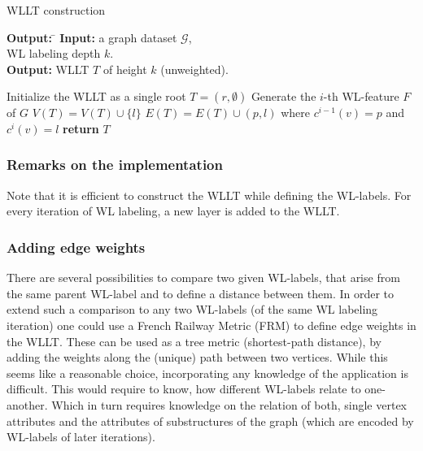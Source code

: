 \begin{algorithm}[H]
	\caption{WLLT construction} \label{alg:WLLTconstruction} 
	\begin{tabbing}
		\textbf{Output:} \= \kill
		\textbf{Input:} \>a graph dataset $\mathcal{G}$,\\
		\>WL labeling depth $k$.\\
		\textbf{Output:} \>WLLT $T$ of height $k$ (unweighted).
	\end{tabbing}	
	\begin{algorithmic}[1]		
		\State Initialize the WLLT as a single root $T=({r}, \emptyset)$
				\State Generate the $i$-th WL-feature $F$ of $G$
						\State $V(T) = V(T) \cup \{ l \}$
						\State $E(T) = E(T) \cup (p, l)$ where $c^{i-1}(v)=p$ and $c^{i}(v)=l$ 
					\EndIf					
				\EndFor
			\EndFor
		\EndFor
		\State \textbf{return} $T$
	\end{algorithmic}
\end{algorithm}

\subsubsection{Remarks on the implementation}

Note that it is efficient to construct the WLLT while defining the WL-labels. 
For every iteration of WL labeling, a new layer is added to the WLLT. 

\subsubsection{Adding edge weights} %

There are several possibilities to compare two given WL-labels, that arise from the same parent WL-label and to define a distance between them. 
In order to extend such a comparison to any two WL-labels (of the same WL labeling iteration) one could use a French Railway Metric (FRM) to define edge weights in the WLLT. 
These can be used as a tree metric (shortest-path distance), by adding the weights along the (unique) path between two vertices.
While this seems like a reasonable choice, incorporating any knowledge of the application is difficult.
This would require to know, how different WL-labels relate to one-another. 
Which in turn requires knowledge on the relation of both, single vertex attributes and the attributes of substructures of the graph (which are encoded by WL-labels of later iterations).

